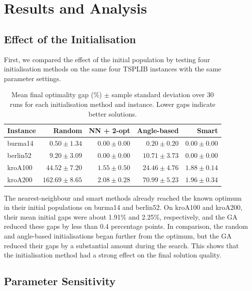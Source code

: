 \documentclass[11pt,a4paper]{article}
\begin{document}
\section{Results and Analysis}
\label{sec:results}

\subsection{Effect of the Initialisation}

First, we compared the effect of the initial population by testing four
initialisation methods on the same four TSPLIB instances with the same
parameter settings.

\begin{table}[H]
  \centering
  \small
  \begin{tabular}{lrrrr}
    \toprule
    Instance & Random & NN + 2-opt & Angle-based & Smart \\
    \midrule
    burma14  & $0.50 \pm 1.34$   & $0.00 \pm 0.00$ & $0.20 \pm 0.20$  & $0.00 \pm 0.00$ \\
    berlin52 & $9.20 \pm 3.09$   & $0.00 \pm 0.00$ & $10.71 \pm 3.73$ & $0.00 \pm 0.00$ \\
    kroA100  & $44.52 \pm 7.20$  & $1.55 \pm 0.50$ & $24.46 \pm 4.76$ & $1.88 \pm 0.14$ \\
    kroA200  & $162.69 \pm 8.65$ & $2.08 \pm 0.28$ & $70.99 \pm 5.23$ & $1.96 \pm 0.34$ \\
    \bottomrule
  \end{tabular}
  \caption{Mean final optimality gap (\%) $\pm$ sample standard deviation over 30 runs for each initialisation method and instance. Lower gaps indicate better solutions.}
  \label{tab:init-results}
\end{table}

The nearest-neighbour and smart methods already reached the known optimum in
their initial populations on burma14 and berlin52. On kroA100 and kroA200,
their mean initial gaps were about 1.91\% and 2.25\%, respectively, and the GA
reduced these gaps by less than 0.4 percentage points. In comparison, the
random and angle-based initialisations began further from the optimum, but the
GA reduced their gaps by a substantial amount during the search.
This shows that the initialisation method had a strong effect on the final
solution quality.


\subsection{Parameter Sensitivity}
\end{document}
